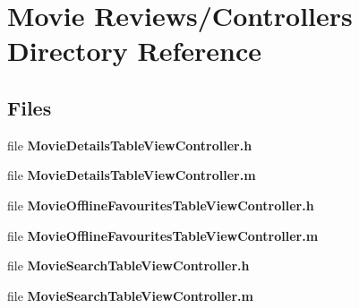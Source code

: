\section{Movie Reviews/\+Controllers Directory Reference}
\label{dir_388f97d6004f5652b1fe17bc9934b8fb}
\subsection*{Files}
\begin{DoxyCompactItemize}
\item 
file {\bfseries Movie\+Details\+Table\+View\+Controller.\+h}
\item 
file {\bfseries Movie\+Details\+Table\+View\+Controller.\+m}
\item 
file {\bfseries Movie\+Offline\+Favourites\+Table\+View\+Controller.\+h}
\item 
file {\bfseries Movie\+Offline\+Favourites\+Table\+View\+Controller.\+m}
\item 
file {\bfseries Movie\+Search\+Table\+View\+Controller.\+h}
\item 
file {\bfseries Movie\+Search\+Table\+View\+Controller.\+m}
\end{DoxyCompactItemize}
